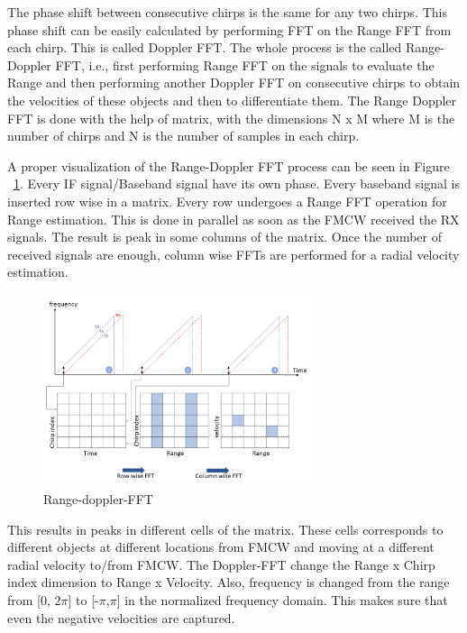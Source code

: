 The phase shift between consecutive chirps is the same for any two chirps. This phase shift can be easily calculated by performing FFT on the Range FFT from each chirp. This is called Doppler FFT. The whole process is the called Range-Doppler FFT, i.e., first performing Range FFT on the signals to evaluate the Range and then performing another Doppler FFT on consecutive chirps to obtain the velocities of these objects and then to differentiate them. 
The Range Doppler FFT is done with the help of matrix, with the dimensions N x M where M is the number of chirps and N is the number of samples in each chirp.

A proper visualization of the Range-Doppler FFT process can be seen in Figure ~\ref{fig:range-doppler-FFT}. Every IF signal/Baseband signal have its own phase. Every baseband signal is inserted row wise in a matrix. Every row undergoes a Range FFT operation for Range estimation. This is done in parallel as soon as the FMCW received the RX signals. The result is peak in some columns of the matrix. Once the number of received signals are enough, column wise FFTs are performed for a radial velocity estimation.
 \begin{figure}[ht]
  \begin{center}
    \includegraphics[width=0.7\textwidth]{Master's thesis/images/range_doppler1.png}
    \caption{Range-doppler-FFT}
    \label{fig:range-doppler-FFT}
  \end{center}
\end{figure}  



This results in peaks in different cells of the matrix. These cells corresponds to different objects at different locations from FMCW and moving at a different radial velocity to/from FMCW. The Doppler-FFT change the Range x Chirp index dimension to Range x Velocity. Also, frequency is changed from the range from [0, $2\pi$] to [-$\pi$,$\pi$] in the normalized frequency domain. This makes sure that even the negative velocities are captured.

